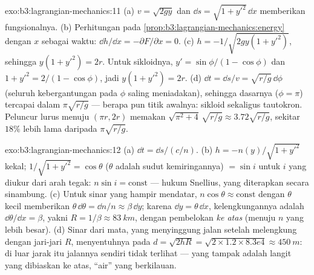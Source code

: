 \begin{solution}{exo:b3:lagrangian-mechanics:11}
(a) $v = \sqrt{2gy}$ dan $\dd s = \sqrt{1 + y'^2}\,\dd x$ memberikan
fungsionalnya. (b) Perhitungan pada
\cref{prop:b3:lagrangian-mechanics:energy} dengan $x$ sebagai waktu: $\dd
h/\dd x = -\partial F/\partial x = 0$. (c) $h = -1/\sqrt{2gy(1 +
y'^2)}$, sehingga $y(1 + y'^2) = 2r$. Untuk sikloidnya, $y' =
\sin\phi/(1 - \cos\phi)$ dan $1 + y'^2 = 2/(1 - \cos\phi)$, jadi
$y(1 + y'^2) = 2r$. (d) $\dd t = \dd s/v = \sqrt{r/g}\,\dd\phi$ (seluruh
kebergantungan pada $\phi$ saling meniadakan), sehingga dasarnya ($\phi = \pi$) tercapai dalam
$\pi\sqrt{r/g}$ --- berapa pun titik awalnya: sikloid sekaligus
tautokron. Peluncur lurus menuju $(\pi r, 2r)$ memakan $\sqrt{\pi^2
+ 4}\,\sqrt{r/g} \approx 3.72\sqrt{r/g}$, sekitar $18\%$ lebih lama
daripada $\pi\sqrt{r/g}$.
\end{solution}

\begin{solution}{exo:b3:lagrangian-mechanics:12}
(a) $\dd t = \dd s/(c/n)$. (b) $h = -n(y)/\sqrt{1 + y'^2}$ kekal;
$1/\sqrt{1 + y'^2} = \cos\theta$ ($\theta$ adalah sudut kemiringannya)
$= \sin i$ untuk $i$ yang diukur dari arah tegak: $n\sin i = \text{const}$ ---
hukum Snellius, yang diterapkan secara sinambung. (c) Untuk sinar yang
hampir mendatar, $n\cos\theta \approx \text{const}$ dengan $\theta$ kecil memberikan
$\theta\,\dd\theta = \dd n/n \approx \beta\,\dd y$; karena $\dd y =
\theta\,\dd x$, kelengkungannya adalah $\dd\theta/\dd x = \beta$, yakni $R =
1/\beta \approx \qty{83}{km}$, dengan pembelokan \emph{ke atas} (menuju
$n$ yang lebih besar). (d) Sinar dari mata, yang menyinggung jalan
setelah melengkung dengan jari-jari $R$, menyentuhnya pada $d = \sqrt{2hR} = \sqrt{2 \times 1.2 \times
8.3e4} \approx \qty{450}{m}$: di luar jarak itu jalannya sendiri tidak
terlihat --- yang tampak adalah langit yang dibiaskan ke atas, ``air''
yang berkilauan.
\end{solution}

